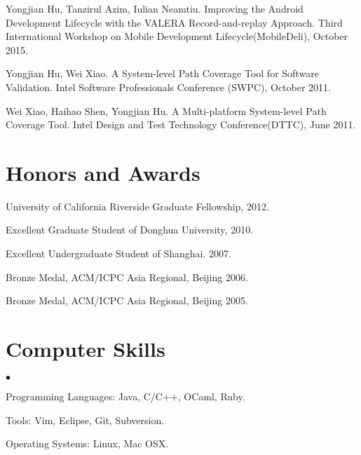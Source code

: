 \documentclass[margin,line]{res}
\newenvironment{list2}{
  \begin{list}{$\bullet$}{%
      \setlength{\itemsep}{0in}
      \setlength{\parsep}{0in} \setlength{\parskip}{0in}
      \setlength{\topsep}{0in} \setlength{\partopsep}{0in} 
      \setlength{\leftmargin}{0.2in}}}{\end{list}}
\begin{document}
\begin{resume}
Yongjian Hu, Tanzirul Azim, Iulian Neamtiu. Improving the Android Development Lifecycle with the VALERA Record-and-replay Approach.
Third International Workshop on Mobile Development Lifecycle(MobileDeli), October 2015.


Yongjian Hu, Wei Xiao. A System-level Path Coverage Tool for Software Validation.
Intel Software Professionals Conference (SWPC), October 2011.

Wei Xiao, Haihao Shen, Yongjian Hu. A Multi-platform System-level Path Coverage Tool.
Intel Design and Test Technology Conference(DTTC), June 2011.





\section{\sc Honors and Awards} 
University of California Riverside Graduate Fellowship, 2012.

\vspace*{-2.5mm}
Excellent Graduate Student of Donghua University, 2010.

\vspace*{-2.5mm}
Excellent Undergraduate Student of Shanghai. 2007.

\vspace*{-2.5mm}
Bronze Medal, ACM/ICPC Asia Regional, Beijing 2006.

\vspace*{-2.5mm}
Bronze Medal, ACM/ICPC Asia Regional, Beijing 2005.

\section{\sc Computer Skills} 
\begin{list2}
\item Programming Languages: Java, C/C++, OCaml, Ruby.
\item Tools: Vim, Eclipse, Git, Subversion.
\item Operating Systems: Linux, Mac OSX.
\end{list2}



\end{resume}
\end{document}
